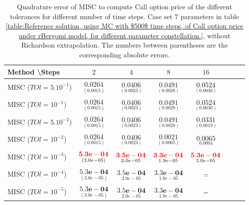 \documentclass[11pt]{article}
\begin{document}
\begin{table}[h!]
	\centering
	\begin{tabular}{l*{6}{c}r}
		Method \textbackslash  Steps            & $2$ & $4$ & $8$ & $16$  \\
		\hline
		MISC ($TOl=5.10^{-1}$)  & $\underset{(  0.0015
			)}{\mathbf{     0.0264}}$ & $\underset{(    0.0023
			)}{\mathbf{         0.0406}}$ & $\underset{(    0.0028)}{\mathbf{      0.0491
		}}$ & $\underset{(      
	0.0030)}{\mathbf{     0.0524
		}}$  \\
		MISC ($TOl=10^{-1}$)  & $\underset{(  0.0015
			)}{\mathbf{     0.0264}}$& $\underset{(    0.0023
			)}{\mathbf{         0.0406}}$& $\underset{(    0.0028)}{\mathbf{      0.0491
		}}$  & $\underset{(      
	0.0030)}{\mathbf{     0.0524
}}$   \\
		MISC ($TOl=5.10^{-2}$)  &$\underset{(  0.0015
			)}{\mathbf{     0.0264}}$ & $\underset{(    0.0023
			)}{\mathbf{         0.0406}}$ & $\underset{(    0.0028)}{\mathbf{      0.0491
		}}$ & $\underset{(  0.0019)}{\mathbf{
		0.0331
	}}$  \\
		MISC ($TOl=10^{-2}$)  & $\underset{(  0.0015
			)}{\mathbf{     0.0264}}$ &$\underset{(    0.0023
			)}{\mathbf{         0.0406}}$ & $\underset{(0.0005)}{\mathbf{    0.0021
		}}$ &  $\underset{0.0004}{\mathbf{    0.0065}}$  \\
		MISC ($TOl=10^{-3}$)  & $\underset{(      3.0e-05)}{\mathbf{    {\color{red}5.3e-04}}}$ & $\underset{2.0e-05}{\mathbf{{\color{red}3.5e-04}}}$& $\underset{1.9e-05}{\mathbf{{\color{red}3.3e-04}}}$ &  $\underset{3.0e-05}{\mathbf{{\color{red}5.3e-04}}}$  \\
		MISC ($TOl=10^{-4}$)  & $\underset{(      3.0e-05)}{\mathbf{    5.3e-04}}$ & $\underset{2.0e-05}{\mathbf{3.5e-04}}$& $\underset{1.9e-05}{\mathbf{3.3e-04}}$ & $\underset{-}{\mathbf{-}}$  \\
		
		MISC ($TOl=10^{-5}$)  & $\underset{(      3.0e-05)}{\mathbf{    5.3e-04}}$ & $\underset{2.0e-05}{\mathbf{3.5e-04}}$& $\underset{1.9e-05}{\mathbf{3.3e-04}}$& $\underset{-}{\mathbf{-}}$  \\
		
		\hline
		
	\end{tabular}
	\caption{Quadrature error of MISC to compute Call option price of the different tolerances for different number of time steps. Case  set $7$ parameters in table \ref{table:Reference solution, using MC with $500$ time steps, of Call option price under rBergomi model, for different parameter constellation.}, without Richardson extrapolation. The numbers between parentheses are the corresponding absolute errors.}
	\label{Quadrature error of MISC to compute Call option price of the different tolerances for different number of time steps. Case  set $7$ parameters, without Richardson extrapolation. The numbers between parentheses are the corresponding absolute errors.}
\end{table}
\end{document}
